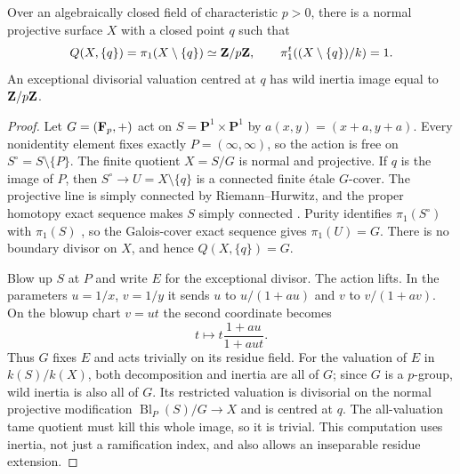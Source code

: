 \begin{example}\label{ex:hidden-wild}
Over an algebraically closed field of characteristic $p>0$, there
is a normal projective surface $X$ with a closed point $q$ such that
\[
 Q(X,\{q\})=\pi_1(X\setminus\{q\})\simeq\mathbf Z/p\mathbf Z,
 \qquad \pi_1^t((X\setminus\{q\})/k)=1.
\]
An exceptional divisorial valuation centred at $q$ has wild inertia
image equal to $\mathbf Z/p\mathbf Z$.
\end{example}
\begin{proof}
Let $G=(\mathbf F_p,+)$ act on $S=\mathbf P^1\times\mathbf P^1$ by
$a(x,y)=(x+a,y+a)$. Every nonidentity element fixes exactly
$P=(\infty,\infty)$, so the action is free on
$S^\circ=S\setminus\{P\}$. The finite quotient $X=S/G$
is normal and projective. If $q$ is the image of $P$, then
$S^\circ\to U=X\setminus\{q\}$ is a connected finite \'etale
$G$-cover. The projective line is simply connected by
Riemann--Hurwitz, and the proper homotopy exact sequence makes
$S$ simply connected \cite[Section 58.15, Tag 0BUM]{Stacks}.
Purity identifies $\pi_1(S^\circ)$ with $\pi_1(S)$
\cite[X, Th\'eor\`eme 3.1]{SGA1}, so the Galois-cover exact
sequence gives $\pi_1(U)=G$. There is no boundary divisor on $X$,
and hence $Q(X,\{q\})=G$.

Blow up $S$ at $P$ and write $E$ for the exceptional divisor.
The action lifts. In the parameters $u=1/x$, $v=1/y$ it sends
$u$ to $u/(1+au)$ and $v$ to $v/(1+av)$. On the blowup chart
$v=ut$ the second coordinate becomes
\[
 t\longmapsto t\frac{1+au}{1+aut}.
\]
Thus $G$ fixes $E$ and acts trivially on its residue field.
For the valuation of $E$ in $k(S)/k(X)$, both decomposition
and inertia are all of $G$; since $G$ is a $p$-group,
wild inertia is also all of $G$. Its restricted valuation is divisorial on the
normal projective modification $\operatorname{Bl}_P(S)/G\to X$
and is centred at $q$. The all-valuation tame quotient must kill
this whole image, so it is trivial. This computation uses inertia,
not just a ramification index, and also allows an inseparable
residue extension.
\end{proof}
